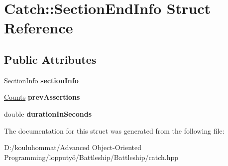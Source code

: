 \hypertarget{struct_catch_1_1_section_end_info}{}\section{Catch\+:\+:Section\+End\+Info Struct Reference}
\label{struct_catch_1_1_section_end_info}
\subsection*{Public Attributes}
\begin{DoxyCompactItemize}
\item 
\mbox{\label{struct_catch_1_1_section_end_info_a2d44793392cb83735d086d726822abe9}} 
\mbox{\hyperlink{struct_catch_1_1_section_info}{Section\+Info}} {\bfseries section\+Info}
\item 
\mbox{\label{struct_catch_1_1_section_end_info_ae70b154cbc05b5dd2901d97f89303d8c}} 
\mbox{\hyperlink{struct_catch_1_1_counts}{Counts}} {\bfseries prev\+Assertions}
\item 
\mbox{\label{struct_catch_1_1_section_end_info_a7c262f2dab9cff166b8eca620c47eea5}} 
double {\bfseries duration\+In\+Seconds}
\end{DoxyCompactItemize}


The documentation for this struct was generated from the following file\+:\begin{DoxyCompactItemize}
\item 
D\+:/kouluhommat/\+Advanced Object-\/\+Oriented Programming/lopputyö/\+Battleship/\+Battleship/catch.\+hpp\end{DoxyCompactItemize}
